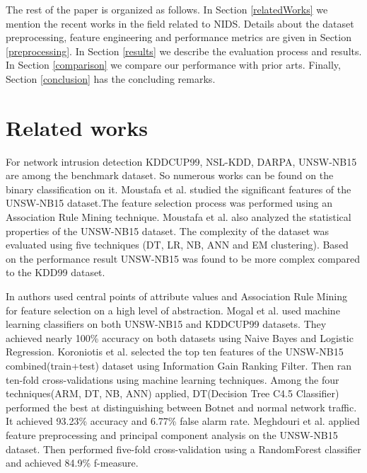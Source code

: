 \documentclass[14pt, conference]{IEEEtran}
\begin{document}
The rest of the paper is organized as follows. In Section \ref{relatedWorks} we mention the recent works in the field related to NIDS. Details about the dataset preprocessing, feature engineering and performance metrics are given in Section \ref{preprocessing}. In Section \ref{results} we describe the evaluation process and results. In Section \ref{comparison} we compare our performance with prior arts. Finally, Section \ref{conclusion} has the concluding remarks.


\section{Related works \label{relatedWorks}}
For network intrusion detection KDDCUP99, NSL-KDD, DARPA, UNSW-NB15 are among the benchmark dataset. So numerous works can be found on the binary classification on it. Moustafa et al. \cite{moustafa2015significant} studied the significant features of the UNSW-NB15 dataset.The feature selection process was performed using an Association Rule Mining technique. Moustafa et al. \cite{moustafa2016evaluation} also analyzed the statistical properties of the UNSW-NB15 dataset. The complexity of the dataset was  evaluated using five techniques (DT, LR, NB, ANN and EM clustering). Based on the performance result UNSW-NB15 was found to be more complex compared to the KDD99 dataset. 

In \cite{moustafa2017hybrid} authors used central points of attribute values and Association Rule Mining for feature selection on a high level of abstraction. Mogal et al. \cite{mogal2017nids} used machine learning classifiers on both UNSW-NB15 and KDDCUP99 datasets. They achieved nearly 100\% accuracy on both datasets using Naive Bayes and Logistic Regression. Koroniotis et al.\cite{koroniotis2017towards} selected the top ten features of the UNSW-NB15 combined(train+test) dataset using Information Gain Ranking Filter. Then ran ten-fold cross-validations using machine learning techniques. Among the four techniques(ARM, DT, NB, ANN) applied, DT(Decision Tree C4.5 Classifier) performed the best at distinguishing between Botnet and normal network traffic. It achieved 93.23\% accuracy and 6.77\% false alarm rate. Meghdouri et al. \cite{meghdouri2018analysis} applied feature preprocessing and principal component analysis on the UNSW-NB15 dataset. Then performed five-fold cross-validation using a RandomForest classifier and achieved 84.9\% f-measure. 
\end{document}

